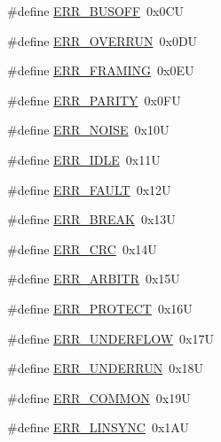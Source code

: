 \begin{DoxyCompactItemize}
\item 
\#define \hyperlink{group___p_e___error__module_ga210385b149e9e04a454830bf0776cfcf}{E\-R\-R\-\_\-\-B\-U\-S\-O\-F\-F}~0x0\-C\-U
\item 
\#define \hyperlink{group___p_e___error__module_gae74be901f0269b1eb26bdc9da203fc86}{E\-R\-R\-\_\-\-O\-V\-E\-R\-R\-U\-N}~0x0\-D\-U
\item 
\#define \hyperlink{group___p_e___error__module_ga93dabff90378a5940feeb66d540016f0}{E\-R\-R\-\_\-\-F\-R\-A\-M\-I\-N\-G}~0x0\-E\-U
\item 
\#define \hyperlink{group___p_e___error__module_ga98e764e239ae37e9a70216cc7aa4ec64}{E\-R\-R\-\_\-\-P\-A\-R\-I\-T\-Y}~0x0\-F\-U
\item 
\#define \hyperlink{group___p_e___error__module_ga5b737bc2671b7207bb41b23b7edd0386}{E\-R\-R\-\_\-\-N\-O\-I\-S\-E}~0x10\-U
\item 
\#define \hyperlink{group___p_e___error__module_gaef1b4ee0b954443aaeb5c106d13bb70c}{E\-R\-R\-\_\-\-I\-D\-L\-E}~0x11\-U
\item 
\#define \hyperlink{group___p_e___error__module_ga90cb6ddc0765a1390dd484202f5169db}{E\-R\-R\-\_\-\-F\-A\-U\-L\-T}~0x12\-U
\item 
\#define \hyperlink{group___p_e___error__module_gae7143596878f82b81e311828b171034d}{E\-R\-R\-\_\-\-B\-R\-E\-A\-K}~0x13\-U
\item 
\#define \hyperlink{group___p_e___error__module_gae2f8372efd8fbf20128240c45f597109}{E\-R\-R\-\_\-\-C\-R\-C}~0x14\-U
\item 
\#define \hyperlink{group___p_e___error__module_gafd7b5442caf73be59c1917b3e9741c32}{E\-R\-R\-\_\-\-A\-R\-B\-I\-T\-R}~0x15\-U
\item 
\#define \hyperlink{group___p_e___error__module_gabf20f3e8d98667fc04b0c79ddc756edf}{E\-R\-R\-\_\-\-P\-R\-O\-T\-E\-C\-T}~0x16\-U
\item 
\#define \hyperlink{group___p_e___error__module_ga0e0f76be42ac68519b962029a71317ed}{E\-R\-R\-\_\-\-U\-N\-D\-E\-R\-F\-L\-O\-W}~0x17\-U
\item 
\#define \hyperlink{group___p_e___error__module_gad63d6a13b7456014efbf4eeeb3c3ace4}{E\-R\-R\-\_\-\-U\-N\-D\-E\-R\-R\-U\-N}~0x18\-U
\item 
\#define \hyperlink{group___p_e___error__module_ga60f7c1fa4fb4fb9ac4883eac3a7a7961}{E\-R\-R\-\_\-\-C\-O\-M\-M\-O\-N}~0x19\-U
\item 
\#define \hyperlink{group___p_e___error__module_ga0f54dc49decc242d4a14cb0b2c1099e6}{E\-R\-R\-\_\-\-L\-I\-N\-S\-Y\-N\-C}~0x1\-A\-U
\item 

\end{DoxyCompactItemize}
